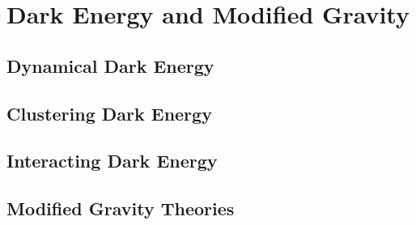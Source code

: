 \chapter{Dark Energy and Modified Gravity}

\section{Dynamical Dark Energy}

\section{Clustering Dark Energy}

\section{Interacting Dark Energy}

\section{Modified Gravity Theories}
